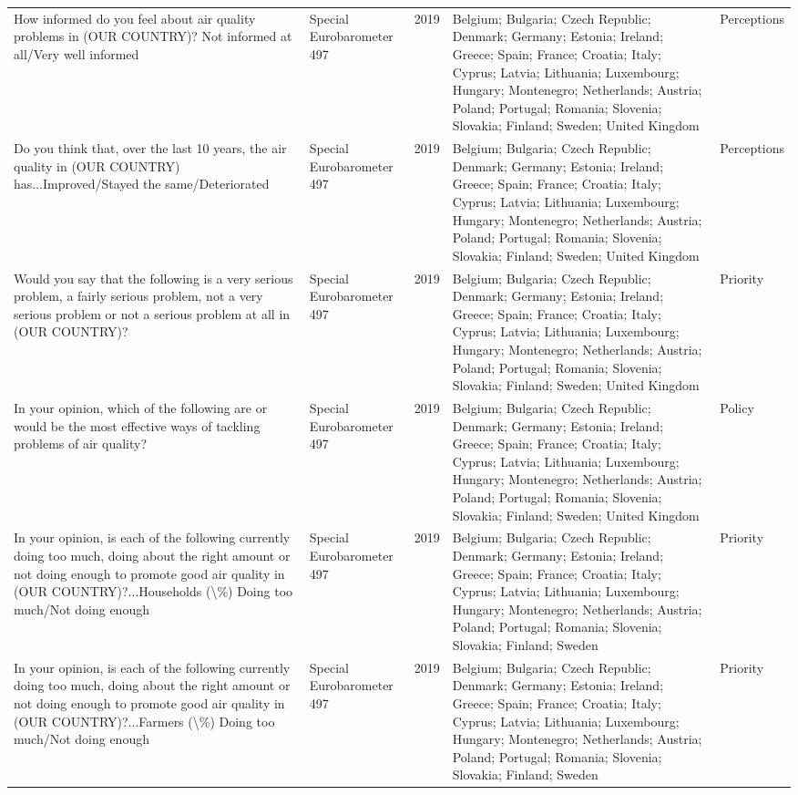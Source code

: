 {\begin{longtable}[t]{p{6cm}lp{2cm}p{4cm}p{2.5cm}}
How informed do you feel about air quality problems in (OUR COUNTRY)? Not informed at all/Very well informed & Special Eurobarometer 497 & 2019 & Belgium; Bulgaria; Czech Republic; Denmark; Germany; Estonia; Ireland; Greece; Spain; France; Croatia; Italy; Cyprus; Latvia; Lithuania; Luxembourg; Hungary; Montenegro; Netherlands; Austria; Poland; Portugal; Romania; Slovenia; Slovakia; Finland; Sweden; United Kingdom & Perceptions\\
Do you think that, over the last 10 years, the air quality in (OUR COUNTRY) has...Improved/Stayed the same/Deteriorated & Special Eurobarometer 497 & 2019 & Belgium; Bulgaria; Czech Republic; Denmark; Germany; Estonia; Ireland; Greece; Spain; France; Croatia; Italy; Cyprus; Latvia; Lithuania; Luxembourg; Hungary; Montenegro; Netherlands; Austria; Poland; Portugal; Romania; Slovenia; Slovakia; Finland; Sweden; United Kingdom & Perceptions\\
Would you say that the following is a very serious problem, a fairly serious problem, not a very serious problem or not a serious problem at all in (OUR COUNTRY)? & Special Eurobarometer 497 & 2019 & Belgium; Bulgaria; Czech Republic; Denmark; Germany; Estonia; Ireland; Greece; Spain; France; Croatia; Italy; Cyprus; Latvia; Lithuania; Luxembourg; Hungary; Montenegro; Netherlands; Austria; Poland; Portugal; Romania; Slovenia; Slovakia; Finland; Sweden; United Kingdom & Priority\\
\addlinespace
In your opinion, which of the following are or would be the most effective ways of tackling problems of air quality? & Special Eurobarometer 497 & 2019 & Belgium; Bulgaria; Czech Republic; Denmark; Germany; Estonia; Ireland; Greece; Spain; France; Croatia; Italy; Cyprus; Latvia; Lithuania; Luxembourg; Hungary; Montenegro; Netherlands; Austria; Poland; Portugal; Romania; Slovenia; Slovakia; Finland; Sweden; United Kingdom & Policy\\
In your opinion, is each of the following currently doing too much, doing about the right amount or not doing enough to promote good air quality in (OUR COUNTRY)?...Households (\textbackslash{}\%) Doing too much/Not doing enough & Special Eurobarometer 497 & 2019 & Belgium; Bulgaria; Czech Republic; Denmark; Germany; Estonia; Ireland; Greece; Spain; France; Croatia; Italy; Cyprus; Latvia; Lithuania; Luxembourg; Hungary; Montenegro; Netherlands; Austria; Poland; Portugal; Romania; Slovenia; Slovakia; Finland; Sweden & Priority\\
In your opinion, is each of the following currently doing too much, doing about the right amount or not doing enough to promote good air quality in (OUR COUNTRY)?...Farmers (\textbackslash{}\%) Doing too much/Not doing enough & Special Eurobarometer 497 & 2019 & Belgium; Bulgaria; Czech Republic; Denmark; Germany; Estonia; Ireland; Greece; Spain; France; Croatia; Italy; Cyprus; Latvia; Lithuania; Luxembourg; Hungary; Montenegro; Netherlands; Austria; Poland; Portugal; Romania; Slovenia; Slovakia; Finland; Sweden & Priority\\

\end{longtable}}
